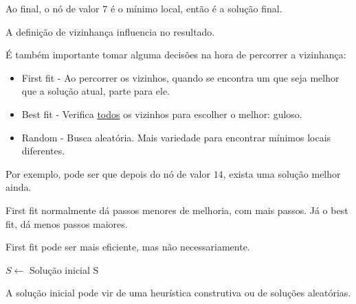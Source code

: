 Ao final, o nó de valor $7$ é o mínimo local, então é a solução final.

A definição de vizinhança influencia no resultado.

É também importante tomar alguma decisões na hora de percorrer a vizinhança:

\begin{itemize}
    \item First fit - Ao percorrer os vizinhos, quando se encontra um que seja melhor que a solução atual, parte para ele.
    \item Best fit - Verifica \underline{todos} os vizinhos para escolher o melhor: guloso.
    \item Random - Busca aleatória. Mais variedade para encontrar mínimos locais diferentes.
\end{itemize}

Por exemplo, pode ser que depois do nó de valor $14$, exista uma solução melhor ainda.

\begin{example}
    \centering
\end{example}

First fit normalmente dá passos menores de melhoria, com mais passos. Já o best fit, dá menos passos maiores.

First fit pode ser mais eficiente, mas não necessariamente.

\newpage

\begin{algorithm}
\SetAlgoLined

$S \gets$ Solução inicial\;
\Retorna S
\end{algorithm}

A solução inicial pode vir de uma heurística construtiva ou de soluções aleatórias.

